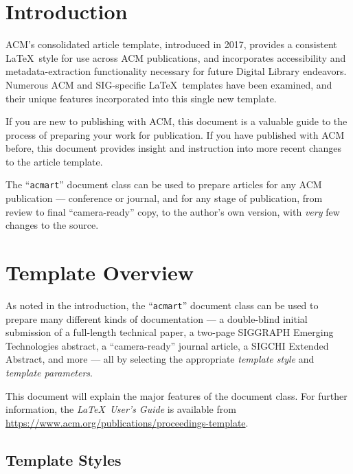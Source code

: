 \documentclass[sigconf]{acmart}
\begin{document}
\maketitle

\section{Introduction}
ACM's consolidated article template, introduced in 2017, provides a
consistent \LaTeX\ style for use across ACM publications, and
incorporates accessibility and metadata-extraction functionality
necessary for future Digital Library endeavors. Numerous ACM and
SIG-specific \LaTeX\ templates have been examined, and their unique
features incorporated into this single new template.

If you are new to publishing with ACM, this document is a valuable
guide to the process of preparing your work for publication. If you
have published with ACM before, this document provides insight and
instruction into more recent changes to the article template.

The ``\verb|acmart|'' document class can be used to prepare articles
for any ACM publication --- conference or journal, and for any stage
of publication, from review to final ``camera-ready'' copy, to the
author's own version, with {\itshape very} few changes to the source.

\section{Template Overview}
As noted in the introduction, the ``\verb|acmart|'' document class can
be used to prepare many different kinds of documentation --- a
double-blind initial submission of a full-length technical paper, a
two-page SIGGRAPH Emerging Technologies abstract, a ``camera-ready''
journal article, a SIGCHI Extended Abstract, and more --- all by
selecting the appropriate {\itshape template style} and {\itshape
  template parameters}.

This document will explain the major features of the document
class. For further information, the {\itshape \LaTeX\ User's Guide} is
available from
\url{https://www.acm.org/publications/proceedings-template}.

\subsection{Template Styles}
\end{document}
